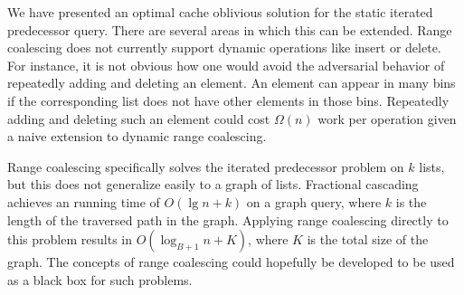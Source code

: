 We have presented an optimal cache oblivious solution for the static 
iterated predecessor query. There are several areas in which this can be extended. 
Range coalescing does not currently support dynamic operations like insert or delete.
For instance, it is not obvious how one would avoid the adversarial behavior of
repeatedly adding and deleting an element.  An element can appear in 
many bins if the corresponding list does not have other
elements in those bins.  Repeatedly 
adding and deleting such an element could cost $\Omega(n)$ work per operation given
a naive extension to dynamic range coalescing.

Range coalescing specifically solves the iterated predecessor problem on $k$ lists, but this does 
not generalize easily to a graph of lists. Fractional cascading achieves an running time of
$O(\lg n + k)$ on a graph query, where $k$ is the length of the traversed path in the graph. 
Applying range coalescing directly to this problem results in $O(\log_{B+1} n + K)$, 
where $K$ is the total size of the graph. The concepts of range coalescing could 
hopefully be developed to be used as a black box for such problems.

